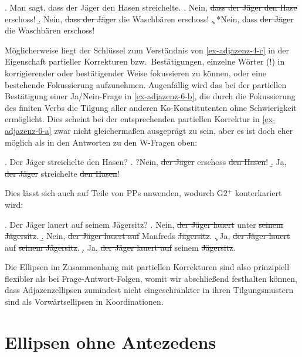 \ex. \label{ex-adjazenz-5}Man sagt, dass der Jäger den Hasen streichelte.
\a. Nein, \sout{dass der Jäger den Hase} erschoss!
\b. Nein, \sout{dass der Jäger} die Waschbären erschoss!
\c. *Nein, dass \sout{der Jäger} die Waschbären erschoss!

Möglicherweise liegt der Schlüssel zum Verständnis von \ref{ex-adjazenz-4-c} in der Eigenschaft partieller Korrekturen bzw.\ Bestätigungen, einzelne Wörter (!) in korrigierender oder bestätigender Weise fokussieren zu können, oder eine bestehende  Fokussierung aufzunehmen. Augenfällig wird das bei der partiellen Bestätigung einer Ja/Nein-Frage in \ref{ex-adjazenz-6-b}, die durch die Fokussierung des finiten Verbs die Tilgung aller anderen Ko-Konstitutenten ohne Schwierigkeit ermöglicht. Dies scheint bei der entsprechenden partiellen Korrektur in \ref{ex-adjazenz-6-a} zwar nicht gleicherma\ss en ausgeprägt zu sein, aber es ist doch eher möglich als in den Antworten zu den W-Fragen oben:  

\ex. \label{ex-adjazenz-6}Der Jäger streichelte den Hasen?
\a. ?Nein, \sout{der Jäger} erschoss \sout{den Hasen}!\label{ex-adjazenz-6-a}
\b. Ja, \sout{der Jäger} streichelte \sout{den Hasen}!\label{ex-adjazenz-6-b}

Dies lässt sich auch auf Teile von PPs anwenden, wodurch G2$^+$ konterkariert wird:

\ex. \label{ex-adjazenz-7} Der Jäger lauert auf seinem Jägersitz?
\a. \label{ex-adjazenz-7-a} Nein, \sout{der Jäger lauert} unter \sout{seinem Jägersitz}. \b. Nein, \sout{der Jäger lauert auf} Manfreds \sout{Jägersitz}.
\c. Ja, \label{ex-adjazenz-7-b} \sout{der Jäger lauert} auf \sout{seinem Jägersitz}.
\d. Ja, \label{ex-adjazenz-7-c} \sout{der Jäger lauert auf} seinem \sout{Jägersitz}.

Die Ellipsen im Zusammenhang mit partiellen Korrekturen sind also prinzipiell flexibler als bei Frage-Antwort-Folgen, womit wir abschlie\ss end festhalten können, dass  Adjazenzellipsen zumindest nicht eingeschränkter in ihren Tilgungsmustern sind als Vorwärtsellipsen in Koordinationen.


\section{Ellipsen ohne Antezedens} \label{sec-situative-ellipsen}

